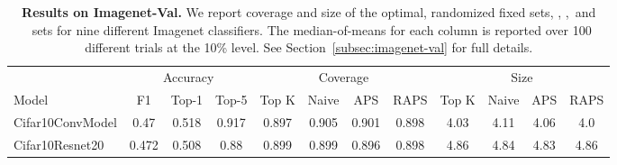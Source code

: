 \begin{table}[t] 
\centering 
\small 
\begin{tabular}{lccccccccccc} 
\toprule 
 & \multicolumn{3}{c}{Accuracy}  & \multicolumn{4}{c}{Coverage} & \multicolumn{4}{c}{Size} \\ 
\cmidrule(r){3-4}  \cmidrule(r){5-8}  \cmidrule(r){9-12} 
Model & F1 & Top-1 & Top-5 & Top K & Naive & APS & RAPS & Top K & Naive & APS & RAPS \\ 
\midrule 
 Cifar10ConvModel &  0.47 &  0.518 &  0.917 & 0.897 & 0.905 & 0.901 & 0.898 & 4.03 & 4.11 & 4.06 & 4.0 \\ 
 Cifar10Resnet20 &  0.472 &  0.508 &  0.88 & 0.899 & 0.899 & 0.896 & 0.898 & 4.86 & 4.84 & 4.83 & 4.86 \\ 
\bottomrule 
\end{tabular} 
\caption{\textbf{Results on Imagenet-Val.} We report coverage and size of the optimal, randomized fixed sets, \naive, \aps,\ and \raps\ sets for nine different Imagenet classifiers. The median-of-means for each column is reported over 100 different trials at the 10\% level. See Section~\ref{subsec:imagenet-val} for full details.} 
\label{table:imagenet-val} 
\end{table} 
